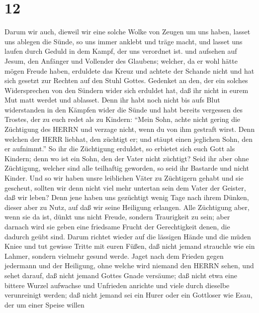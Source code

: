 \hypertarget{section-11}{%
\section{12}\label{section-11}}

 Darum wir auch, dieweil wir eine solche Wolke von Zeugen um
uns haben, lasset uns ablegen die Sünde, so uns immer anklebt und träge
macht, und lasset uns laufen durch Geduld in dem Kampf, der uns
verordnet ist.  und aufsehen auf Jesum, den Anfänger und
Vollender des Glaubens; welcher, da er wohl hätte mögen Freude haben,
erduldete das Kreuz und achtete der Schande nicht und hat sich gesetzt
zur Rechten auf den Stuhl Gottes.  Gedenket an den, der ein
solches Widersprechen von den Sündern wider sich erduldet hat, daß ihr
nicht in eurem Mut matt werdet und ablasset.  Denn ihr habt
noch nicht bis aufs Blut widerstanden in den Kämpfen wider die Sünde
 und habt bereits vergessen des Trostes, der zu euch redet
als zu Kindern: ``Mein Sohn, achte nicht gering die Züchtigung des HERRN
und verzage nicht, wenn du von ihm gestraft wirst.  Denn
welchen der HERR liebhat, den züchtigt er; und stäupt einen jeglichen
Sohn, den er aufnimmt.''  So ihr die Züchtigung erduldet, so
erbietet sich euch Gott als Kindern; denn wo ist ein Sohn, den der Vater
nicht züchtigt?  Seid ihr aber ohne Züchtigung, welcher sind
alle teilhaftig geworden, so seid ihr Bastarde und nicht Kinder.
 Und so wir haben unsre leiblichen Väter zu Züchtigern
gehabt und sie gescheut, sollten wir denn nicht viel mehr untertan sein
dem Vater der Geister, daß wir leben?  Denn jene haben uns
gezüchtigt wenig Tage nach ihrem Dünken, dieser aber zu Nutz, auf daß
wir seine Heiligung erlangen.  Alle Züchtigung aber, wenn
sie da ist, dünkt uns nicht Freude, sondern Traurigkeit zu sein; aber
darnach wird sie geben eine friedsame Frucht der Gerechtigkeit denen,
die dadurch geübt sind.  Darum richtet wieder auf die
lässigen Hände und die müden Kniee  und tut gewisse Tritte
mit euren Füßen, daß nicht jemand strauchle wie ein Lahmer, sondern
vielmehr gesund werde.  Jaget nach dem Frieden gegen
jedermann und der Heiligung, ohne welche wird niemand den HERRN sehen,
 und sehet darauf, daß nicht jemand Gottes Gnade versäume;
daß nicht etwa eine bittere Wurzel aufwachse und Unfrieden anrichte und
viele durch dieselbe verunreinigt werden;  daß nicht jemand
sei ein Hurer oder ein Gottloser wie Esau, der um einer Speise willen
